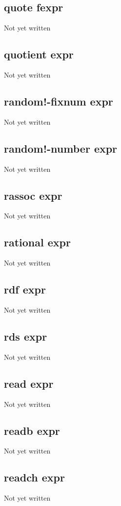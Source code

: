 \documentclass[a4paper,11pt]{article}
\begin{document}
{\subsection{\ttfamily quote fexpr}
Not yet written

\subsection{\ttfamily quotient expr}
Not yet written

\subsection{\ttfamily random!-fixnum expr}
Not yet written

\subsection{\ttfamily random!-number expr}
Not yet written

\subsection{\ttfamily rassoc expr}
Not yet written

\subsection{\ttfamily rational expr}
Not yet written

\subsection{\ttfamily rdf expr}
Not yet written

\subsection{\ttfamily rds expr}
Not yet written

\subsection{\ttfamily read expr}
Not yet written

\subsection{\ttfamily readb expr}
Not yet written

\subsection{\ttfamily readch expr}
Not yet written

}
\end{document}
